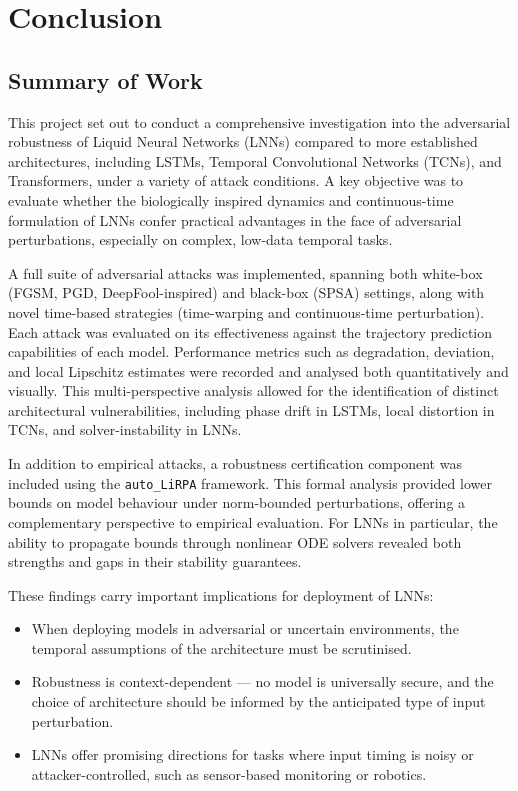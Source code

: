 \chapter{Conclusion}

\section{Summary of Work}

This project set out to conduct a comprehensive investigation into the adversarial robustness of Liquid Neural Networks (LNNs) compared to more established architectures, including LSTMs, Temporal Convolutional Networks (TCNs), and Transformers, under a variety of attack conditions. A key objective was to evaluate whether the biologically inspired dynamics and continuous-time formulation of LNNs confer practical advantages in the face of adversarial perturbations, especially on complex, low-data temporal tasks.

A full suite of adversarial attacks was implemented, spanning both white-box (FGSM, PGD, DeepFool-inspired) and black-box (SPSA) settings, along with novel time-based strategies (time-warping and continuous-time perturbation). Each attack was evaluated on its effectiveness against the trajectory prediction capabilities of each model. Performance metrics such as degradation, deviation, and local Lipschitz estimates were recorded and analysed both quantitatively and visually. This multi-perspective analysis allowed for the identification of distinct architectural vulnerabilities, including phase drift in LSTMs, local distortion in TCNs, and solver-instability in LNNs.

In addition to empirical attacks, a robustness certification component was included using the \texttt{auto\_LiRPA} framework. This formal analysis provided lower bounds on model behaviour under norm-bounded perturbations, offering a complementary perspective to empirical evaluation. For LNNs in particular, the ability to propagate bounds through nonlinear ODE solvers revealed both strengths and gaps in their stability guarantees.

These findings carry important implications for deployment of LNNs:
\begin{itemize}
    \item When deploying models in adversarial or uncertain environments, the temporal assumptions of the architecture must be scrutinised.
    \item Robustness is context-dependent — no model is universally secure, and the choice of architecture should be informed by the anticipated type of input perturbation.
    \item LNNs offer promising directions for tasks where input timing is noisy or attacker-controlled, such as sensor-based monitoring or robotics.
\end{itemize}


